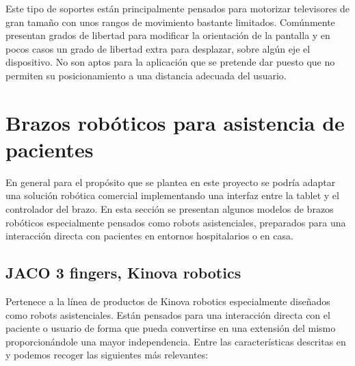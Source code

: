     Este tipo de soportes están principalmente pensados para motorizar televisores de gran tamaño con unos rangos de movimiento bastante limitados. Comúnmente presentan grados de libertad para modificar la orientación de la pantalla y en pocos casos un grado de libertad extra para desplazar, sobre algún eje el dispositivo.  No son aptos para la aplicación que se pretende dar puesto que no permiten su posicionamiento a una distancia adecuada del usuario.

\section{Brazos robóticos para asistencia de pacientes}

	En general para el propósito que se plantea en este proyecto se podría adaptar una solución robótica comercial implementando una interfaz entre la tablet y el controlador del brazo. En esta sección se presentan algunos modelos de brazos robóticos especialmente pensados como robots asistenciales, preparados para una interacción directa con pacientes en entornos hospitalarios o en casa.

 \subsection{JACO 3 fingers, Kinova robotics}
	 Pertenece a la línea de productos de Kinova robotics especialmente diseñados como robots asistenciales. Están pensados para una interacción directa con el paciente o usuario de forma que pueda convertirse en una extensión del mismo proporcionándole una mayor independencia. Entre las características descritas en \cite{Jaco:2018} y \cite{JacoWeb:2018} podemos recoger las siguientes más relevantes:
     \\

